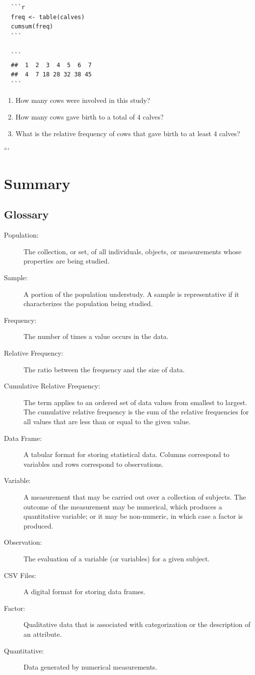 \documentclass[]{krantz}
\theoremstyle{definition}
\theoremstyle{definition}
\theoremstyle{definition}
\theoremstyle{remark}
\begin{document}
\begin{verbatim}
  ```r
  freq <- table(calves)
  cumsum(freq)
  ```
  
  ```
  ##  1  2  3  4  5  6  7 
  ##  4  7 18 28 32 38 45
  ```
\end{verbatim}

\begin{enumerate}
\def\labelenumi{\arabic{enumi}.}
\item
  How many cows were involved in this study?
\item
  How many cows gave birth to a total of 4 calves?
\item
  What is the relative frequency of cows that gave birth to at least 4
  calves?
\end{enumerate}

```

\hypertarget{summary-1}{%
\section{Summary}\label{summary-1}}

\hypertarget{glossary}{%
\subsection*{Glossary}\label{glossary}}


\begin{description}
\item[Population:]
The collection, or set, of all individuals, objects, or measurements
whose properties are being studied.
\item[Sample:]
A portion of the population understudy. A sample is representative
if it characterizes the population being studied.
\item[Frequency:]
The number of times a value occurs in the data.
\item[Relative Frequency:]
The ratio between the frequency and the size of data.
\item[Cumulative Relative Frequency:]
The term applies to an ordered set of data values from smallest to
largest. The cumulative relative frequency is the sum of the
relative frequencies for all values that are less than or equal to
the given value.
\item[Data Frame:]
A tabular format for storing statistical data. Columns correspond to
variables and rows correspond to observations.
\item[Variable:]
A measurement that may be carried out over a collection of subjects.
The outcome of the measurement may be numerical, which produces a
quantitative variable; or it may be non-numeric, in which case a
factor is produced.
\item[Observation:]
The evaluation of a variable (or variables) for a given subject.
\item[CSV Files:]
A digital format for storing data frames.
\item[Factor:]
Qualitative data that is associated with categorization or the
description of an attribute.
\item[Quantitative:]
Data generated by numerical measurements.
\end{description}
\end{document}
